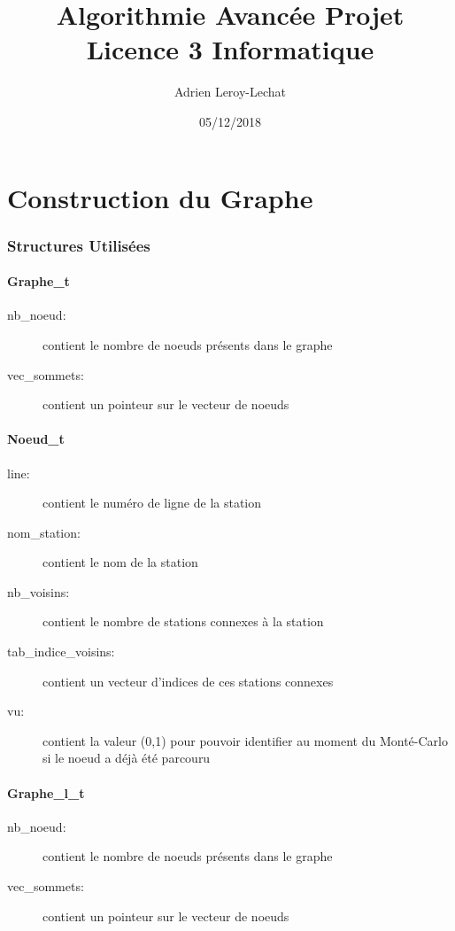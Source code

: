 \documentclass[12pt, twoside]{report}
\title{Algorithmie Avancée Projet Licence 3 Informatique}
\author{Adrien Leroy-Lechat}
\date{05/12/2018}
\begin{document}
\makeindex
\maketitle

\part{Construction du Graphe}
\section{Structures Utilisées}

\subsection{Graphe\_t}
\begin{description}
\item[nb\_noeud:] contient le nombre de noeuds présents dans le graphe
\item[vec\_sommets:] contient un pointeur sur le vecteur de noeuds
\end{description}

\subsection{Noeud\_t}
\begin{description}
\item[line:] contient le numéro de ligne de la station
\item[nom\_station:] contient le nom de la station
\item[nb\_voisins:] contient le nombre de stations connexes à la station
\item[tab\_indice\_voisins:] contient un vecteur d'indices de ces stations connexes
\item[vu:] contient la valeur (0,1) pour pouvoir identifier au moment du Monté-Carlo si le noeud a déjà été parcouru
\end{description}

\subsection{Graphe\_l\_t}
\begin{description}
\item[nb\_noeud:] contient le nombre de noeuds présents dans le graphe
\item[vec\_sommets:] contient un pointeur sur le vecteur de noeuds
\end{description}
\end{document}
